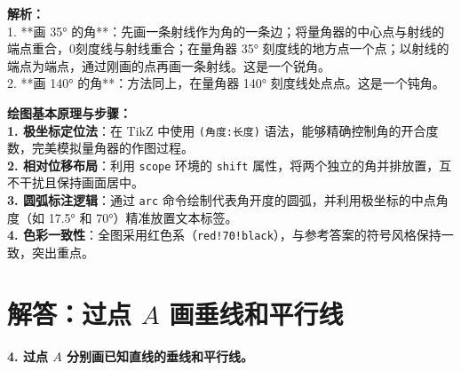 \documentclass[12pt, a4paper]{ctexrep}
\begin{document}
\vspace{0.8cm}

{\small\color{gray}
\textbf{解析：}\\
1. **画 35° 的角**：先画一条射线作为角的一条边；将量角器的中心点与射线的端点重合，0刻度线与射线重合；在量角器 35° 刻度线的地方点一个点；以射线的端点为端点，通过刚画的点再画一条射线。这是一个锐角。\\
2. **画 140° 的角**：方法同上，在量角器 140° 刻度线处点点。这是一个钝角。
}

\vspace{0.6cm}

{\small\color{blue!70!black}
\textbf{绘图基本原理与步骤：}\\
\textbf{1. 极坐标定位法}：在 TikZ 中使用 \texttt{(角度:长度)} 语法，能够精确控制角的开合度数，完美模拟量角器的作图过程。\\
\textbf{2. 相对位移布局}：利用 \texttt{scope} 环境的 \texttt{shift} 属性，将两个独立的角并排放置，互不干扰且保持画面居中。\\
\textbf{3. 圆弧标注逻辑}：通过 \texttt{arc} 命令绘制代表角开度的圆弧，并利用极坐标的中点角度（如 17.5° 和 70°）精准放置文本标签。\\
\textbf{4. 色彩一致性}：全图采用红色系（\texttt{red!70!black}），与参考答案的符号风格保持一致，突出重点。
}


\newpage

\section{解答：过点 $A$ 画垂线和平行线}

\vspace{0.4cm}

\noindent\textbf{4. 过点 $A$ 分别画已知直线的垂线和平行线。}

\vspace{1.2cm}
\end{document}
